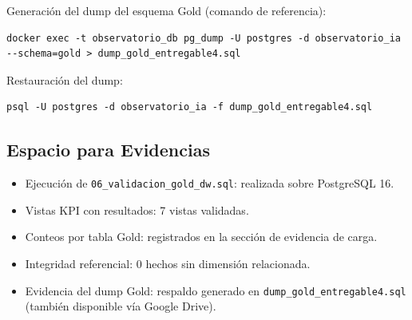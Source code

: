 \documentclass[12pt,a4paper]{article}
\newcommand{\pathcode}[1]{\begingroup\scriptsize\ttfamily\nolinkurl{#1}\endgroup}
\begin{document}
\vspace{0.4cm}
Generaci\'on del dump del esquema Gold (comando de referencia):

\begingroup
\footnotesize
\begin{verbatim}
docker exec -t observatorio_db pg_dump -U postgres -d observatorio_ia --schema=gold > dump_gold_entregable4.sql
\end{verbatim}
\endgroup

Restauraci\'on del dump:

\begingroup
\footnotesize
\begin{verbatim}
psql -U postgres -d observatorio_ia -f dump_gold_entregable4.sql
\end{verbatim}
\endgroup

\subsection{Espacio para Evidencias}

\begin{itemize}[leftmargin=1.2cm]
    \item Ejecuci\'on de \pathcode{06_validacion_gold_dw.sql}: realizada sobre PostgreSQL 16.
    \item Vistas KPI con resultados: 7 vistas validadas.
    \item Conteos por tabla Gold: registrados en la secci\'on de evidencia de carga.
    \item Integridad referencial: 0 hechos sin dimensi\'on relacionada.
    \item Evidencia del dump Gold: respaldo generado en \pathcode{dump_gold_entregable4.sql} (tambi\'en disponible v\'ia Google Drive).
\end{itemize}
\end{document}
